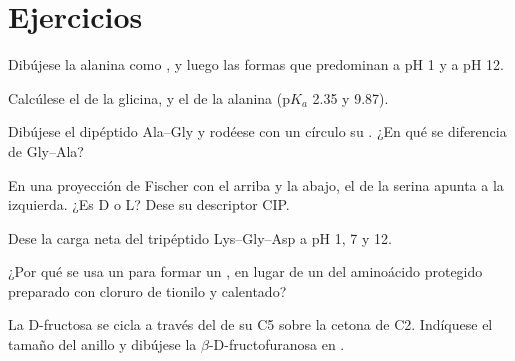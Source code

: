 \section{Ejercicios}

\begin{exercise}[$\star$]\label{exo:b2:biomolecules:1}
Dibújese la alanina como , y luego las formas que predominan a pH 1 y a pH 12.
\end{exercise}

\begin{exercise}[$\star$]\label{exo:b2:biomolecules:2}
Calcúlese el  de la glicina, y el de la alanina ($\mathrm pK_a$ 2.35 y 9.87).
\end{exercise}

\begin{exercise}[$\star$]\label{exo:b2:biomolecules:3}
Dibújese el dipéptido Ala--Gly y rodéese con un círculo su . ¿En qué se diferencia de Gly--Ala?
\end{exercise}

\begin{exercise}[$\star$]\label{exo:b2:biomolecules:4}
En una proyección de Fischer con el  arriba y la   abajo, el
 de la serina apunta a la izquierda. ¿Es D o L? Dese su descriptor CIP.
\end{exercise}

\begin{exercise}[$\star\star$]\label{exo:b2:biomolecules:5}
Dese la carga neta del tripéptido Lys--Gly--Asp a pH 1, 7 y 12.
\end{exercise}

\begin{exercise}[$\star\star$]\label{exo:b2:biomolecules:6}
¿Por qué se usa un  para formar un , en lugar de un  del aminoácido
protegido preparado con cloruro de tionilo y calentado?
\end{exercise}

\begin{exercise}[$\star\star$]\label{exo:b2:biomolecules:7}
La D-fructosa se cicla a través del  de su C5 sobre la cetona de C2. Indíquese el tamaño del anillo y dibújese la
$\beta$-D-fructofuranosa en .
\end{exercise}

